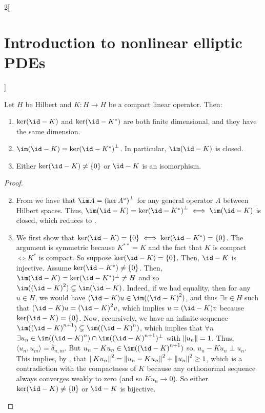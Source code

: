 \documentclass[../../../main_math.tex]{subfiles}
\begin{document}
\begin{multicols}{2}[\section{Introduction to nonlinear elliptic PDEs}]
  \begin{theorem}\label{INEPDE:fredholm}
    Let $H$ be Hilbert and $K:H\to H$ be a compact linear operator. Then:
    \begin{enumerate}
      \item $\ker(\id-K)$ and $\ker(\id-K^*)$ are both finite dimensional, and they have the same dimension.
      \item $\im(\id-K)={\ker(\id-K^*)}^\perp$. In particular, $\im(\id-K)$ is closed.
      \item Either $\ker(\id-K)\ne\{0\}$ or $\id -K$ is an isomorphism.
    \end{enumerate}
  \end{theorem}
  \begin{proof}
    \begin{enumerate}
      \setcounter{enumi}{1}
      \item From  we have that $\overline{\im A}={(\ker A^*)}^\perp$ for any general operator $A$ between Hilbert spaces. Thus, $\im(\id-K)={\ker(\id-K^*)}^\perp\iff \im(\id-K)$ is closed, which reduces to .
      \item We first show that $\ker(\id-K)=\{0\}\iff \ker(\id-K^*)=\{0\}$. The argument is symmetric because $K^{**}=K$ and the fact that $K$ is compact $\iff K^*$ is compact. So suppose $\ker(\id-K)=\{0\}$. Then, $\id -K$ is injective. Assume $\ker(\id-K^*)\ne\{0\}$. Then, $\im (\id-K)=\ker(\id-K^*)^\perp\ne H$ and so $\im({(\id-K)}^2)\subsetneq \im(\id-K)$. Indeed, if we had equality, then for any $u\in H$, we would have ${(\id-K)u}\in \im({(\id-K)}^2)$, and thus $\exists v\in H$ such that ${(\id-K)u}={(\id-K)}^2v$, which implies $u={(\id-K)}v$ because $\ker (\id-K)=\{0\}$. Now, recursively, we have an infinite sequence $\im({(\id-K)}^{n+1})\subsetneq \im({(\id-K)}^n)$, which implies that $\forall n$ $\exists u_n\in \im({(\id-K)}^n)\cap\im({(\id-K)}^{n+1})^\perp$ with $\norm{u_n}=1$. Thus, $\langle u_n,u_m\rangle=\delta_{n,m}$. But $u_n-Ku_n\in \im({(\id-K)}^{n+1})$ so, $u_n-Ku_n\perp u_n$. This implies, by , that $\norm{Ku_n}^2=\norm{u_n-Ku_n}^2+\norm{u_n}^2\geq 1$, which is a contradiction with the compactness of $K$ because any orthonormal sequence always converges weakly to zero (and so $Ku_n\to 0$). So either $\ker(\id-K)\ne\{0\}$ or $\id-K$ is bijective.


\end{enumerate}
\end{proof}
\end{multicols}
\end{document}
